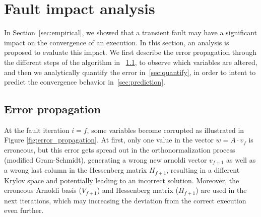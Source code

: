 \section{Fault impact analysis}
In Section~\ref{sec:empirical}, we showed that a transient fault may have a significant impact on the convergence of an execution. In this section, an analysis is proposed to evaluate this impact. We first describe the error propagation through the different steps of the algorithm in ~\ref{sec:propagation}, to observe which variables are altered, and then we analytically quantify the error in~\ref{sec:quantify}, in order to intent to predict the convergence behavior in~\ref{sec:prediction}.


\subsection{Error propagation}\label{sec:propagation}
At the fault iteration $i=f$, some variables become corrupted as illustrated in Figure \ref{fig:error_propagation}. At first, only one value in the vector $w = A \cdot v_f$ is erroneous, but this error gets spread out in the orthonormalization process (modified Gram-Schmidt), generating a wrong new arnoldi vector $v_{f+1}$ as well as a wrong last column in the Hessenberg matrix $H_{f+1}$, resulting in a different Krylov space and potentially leading to an incorrect solution. Moreover, the erroneous Arnoldi basis ($V_{f+1}$) and Hessenberg matrix ($H_{f+1}$) are used in the next iterations, which may increasing the deviation from the correct execution even further. 
